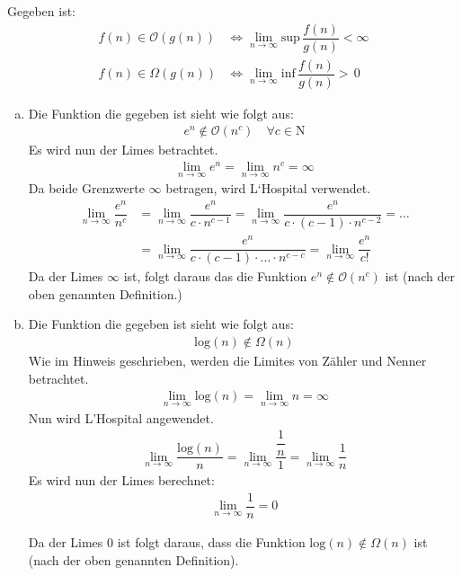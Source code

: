 \documentclass[11pt]{article}
\begin{document}
Gegeben ist:\\
\begin{align*}
f(n) \in  \mathcal{O}(g(n)) &\Leftrightarrow \lim\limits_{n \rightarrow \infty}{\text{sup}\, \dfrac{f(n)}{g(n)} < \infty}\\[0.5cm]
f(n) \in  \Omega(g(n)) &\Leftrightarrow \lim\limits_{n \rightarrow \infty}{\text{inf}\, \dfrac{f(n)}{g(n)} >\, 0}
\end{align*}
\begin{enumerate}[a)]
%
\item Die Funktion die gegeben ist sieht wie folgt aus:
\begin{align*}
e ^{n} \notin \mathcal{O}(n^{c})  \quad \forall c \in \mathrm{N}
\end{align*}
Es wird nun der Limes betrachtet.
\begin{align*}
\lim\limits_{n \rightarrow \infty}{e^{n}} = 
  \lim\limits_{n \rightarrow \infty}{n^c} = \infty
\end{align*}
Da beide Grenzwerte $\infty$ betragen, wird L`Hospital verwendet.
\begin{align*}
\lim\limits_{n \rightarrow \infty}{\dfrac{e^{n}}{n^{c}}} &= \lim\limits_{n \rightarrow \infty}{\dfrac{e^{n}}{c \cdot n^{c - 1}}} = \lim\limits_{n \rightarrow \infty}{\dfrac{e^{n}}{c \cdot (c-1) \cdot n^{c - 2}}} = \ldots \\
& =\lim\limits_{n \rightarrow \infty}{\dfrac{e^{n}}{c \cdot (c-1)\cdot \ldots \cdot n^{c - c}}} = \lim\limits_{n \rightarrow \infty}{\dfrac{e^{n}}{c!}}
\end{align*}
Da der Limes $\infty$ ist, folgt daraus das die Funktion $e^{n} \notin \mathcal{O}(n^c)$ ist (nach der oben genannten Definition.)
\item  Die Funktion die gegeben ist sieht wie folgt aus:
\begin{align*}
\text{log}(n) \notin \Omega(n)
\end{align*}
Wie im Hinweis geschrieben, werden die Limites von Zähler und Nenner betrachtet.
\begin{align*}
\lim\limits_{n \rightarrow \infty}{\text{log}(n)} =
  \lim\limits_{n \rightarrow \infty}{n} = \infty
\end{align*}
Nun wird L'Hospital angewendet.
\begin{align*}
\lim\limits_{n \rightarrow \infty}{\dfrac{\text{log}(n)}{n}} = \lim\limits_{n \rightarrow \infty}{\dfrac{\dfrac{1}{n}}{1}} = \lim\limits_{n \rightarrow \infty}{\dfrac{1}{n}}
\end{align*}
Es wird nun der Limes berechnet:
\begin{align*}
\lim\limits_{n \rightarrow \infty}{\dfrac{1}{n}} = 0
\end{align*}

Da der Limes 0 ist folgt daraus, dass die Funktion $\text{log}(n) \notin \Omega(n)$ ist (nach der oben genannten Definition).

\end{enumerate}
\end{document}
